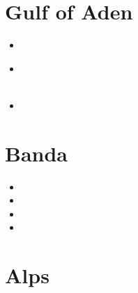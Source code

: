 \section{Gulf of Aden}

\begin{scriptsize}
\begin{itemize}
\item[\twothousandthree] 
\item[\twothousandthirteen] 
  \\
  \\
\item[\twothousandtwenty] 
\end{itemize}
\end{scriptsize}

\section{Banda}

\begin{scriptsize}
\begin{itemize}
\item[\twothousandnine]
\item[\twothousandten]
\item[\twothousandtwentyone]
\item[\twothousandtwentytwo]
\end{itemize}
\end{scriptsize}

\section{Alps}

